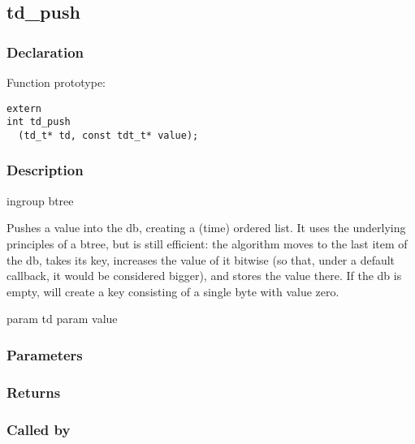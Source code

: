 
\newpage
\subsection{td\_push}
\subsubsection{Declaration} Function prototype:

\begin{verbatim}
extern
int td_push
  (td_t* td, const tdt_t* value);
\end{verbatim}

\subsubsection{Description}


 ingroup btree

 Pushes a value into the db, creating a (time) ordered list.
 It uses the underlying principles of a btree, but is still efficient:
 the algorithm moves to the last item of the db, takes its key,
 increases the value of it bitwise (so that, under a default
 callback, it would be considered bigger), and stores the value there.
 If the db is empty, will create a key consisting of a single byte
 with value zero.

 param td
 param value
 

\subsubsection{Parameters}
\subsubsection{Returns}
\subsubsection{Called by}
